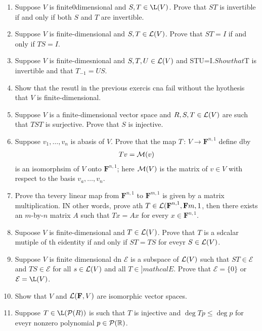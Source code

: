 \documentclass[10pt,a4paper]{report}
\newcommand{\F}{\textbf{F}}
\begin{document}
\begin{enumerate}
\item Suppose $V$ is finite0dimensional and $S,T \in \L(V)$.  Prove that $ST$ is invertible if and only if both $S$ and $T$ are invertible.

\item Suppose $V$ is finite-dimensional and $S,T \in \mathcal{L}(V)$.  Prove that $ST=I$ if and only if $TS=I$.

\item Suppose $V$ is finite-dimesnional and $S,T,U\in \mathcal{L}(V)$ and STU=I$.  Show that $T is invertible and that $T_{-1} = US$.

\item Show that the resutl in the previous exercis cna fail without the hyothesis that $V$ is finite-dimensional.

\item Suppose $V$ is a finite-dimensional vector space and $R,S,T \in \mathcal{L}(V)$ are such that $TST$ is surjective.  Prove that $S$ is injective.

\item Suppose $v_1,\dots,v_n$ is abasis of $V$.  Prove that the map $T\,:\,V \to \F^{n,1}$ define dby 
\begin{align*}
	Tv=\mathcal{M}(v)
\end{align*}is an isomorphsim of $V$ onto $\F^{n,1}$; here $\mathcal{M}(V)$ is the matrix of $v \in V$ with respect to the basis $v_a, \dots, v_n$.

\item Prove tha tevery linear map from $\F^{n,1}$ to $\F^{m,1}$ is given by a matrix multiplication.  IN other words, prove ath $T \in \LL(\F^{n,1},\F{m,1}$, then there exists an $m$-by-$n$ matrix $A$ such that $Tx=Ax$ for every $x \in \F^{n,1}$.

\item Supoose $V$ is finite-dimensional and $T \in \mathcal{L}(V)$.  Prove that $T$ is a sdcalar mutiple of th eidentity if and only if $ST=TS$ for eveyr $S \in \mathcal{L}(V)$.

\item Suppose $V$ is finite dimensional dn $\mathcal{E}$ is a subspace of $\mathcal{L}(V)$ such that $ST \in \mathcal{E}$ and $TS \in \mathcal{E}$ for all $s \in \mathcal{L}(V)$ and all $T \in ]mathcal{E}$.  Prove that $\mathcal{E} = \{0\}$ or $\mathcal{E}=\L(V)$.

\item Show that $V$ and $\LL(\F,V)$ are isomorphic vector spaces.

\item Suppose $T \in \L(\PPP(R))$ is such that $T$ is injective and $\deg Tp\le \deg p$  for eveyr nonzero polynomial $p \in \mathcal{P}(\mathbb{R})$.


\end{enumerate}
\end{document}
